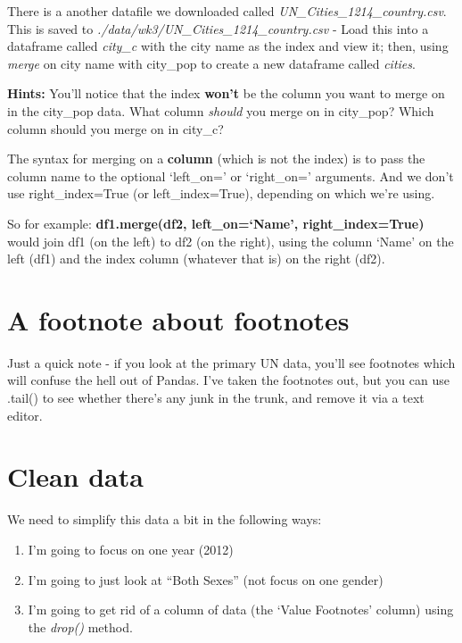 \documentclass[
  letterpaper,
  DIV=11,
  numbers=noendperiod]{scrreprt}
\providecommand{\tightlist}{%
  \setlength{\itemsep}{0pt}\setlength{\parskip}{0pt}}\usepackage{longtable,booktabs,array}
\begin{document}
There is a another datafile we downloaded called
\emph{UN\_Cities\_1214\_country.csv}. This is saved to
\emph{./data/wk3/UN\_Cities\_1214\_country.csv} - Load this into a
dataframe called \emph{city\_c} with the city name as the index and view
it; then, using \emph{merge} on city name with city\_pop to create a new
dataframe called \emph{cities}.

\textbf{Hints:} You'll notice that the index \textbf{won't} be the
column you want to merge on in the city\_pop data. What column
\emph{should} you merge on in city\_pop? Which column should you merge
on in city\_c?

The syntax for merging on a \textbf{column} (which is not the index) is
to pass the column name to the optional `left\_on=' or `right\_on='
arguments. And we don't use right\_index=True (or left\_index=True),
depending on which we're using.

So for example: \textbf{df1.merge(df2, left\_on=`Name',
right\_index=True)} would join df1 (on the left) to df2 (on the right),
using the column `Name' on the left (df1) and the index column (whatever
that is) on the right (df2).

\hypertarget{a-footnote-about-footnotes}{%
\section{A footnote about footnotes}\label{a-footnote-about-footnotes}}

Just a quick note - if you look at the primary UN data, you'll see
footnotes which will confuse the hell out of Pandas. I've taken the
footnotes out, but you can use .tail() to see whether there's any junk
in the trunk, and remove it via a text editor.

\hypertarget{clean-data}{%
\section{Clean data}\label{clean-data}}

We need to simplify this data a bit in the following ways:

\begin{enumerate}
\def\labelenumi{\arabic{enumi}.}
\tightlist
\item
  I'm going to focus on one year (2012)
\item
  I'm going to just look at ``Both Sexes'' (not focus on one gender)
\item
  I'm going to get rid of a column of data (the `Value Footnotes'
  column) using the \emph{drop()} method.
\end{enumerate}
\end{document}
